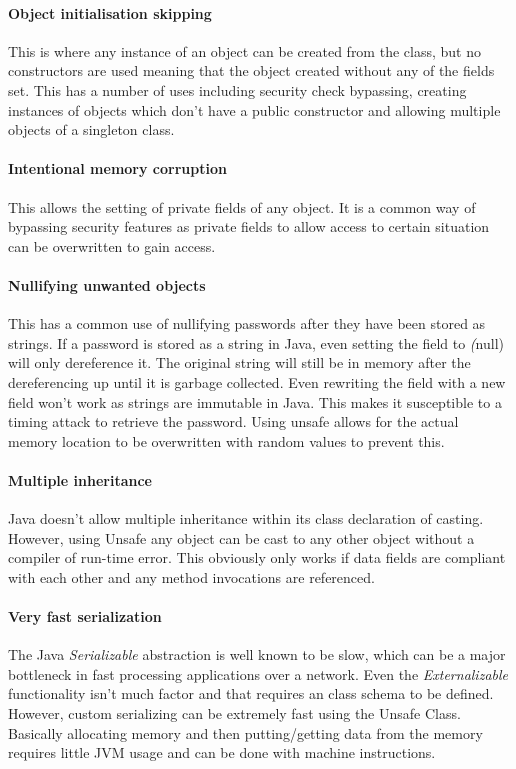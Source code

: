 \documentclass[final_report.tex]{subfiles}
\begin{document}
\paragraph*{Object initialisation skipping}
This is where any instance of an object can be created from the class, but no constructors are used meaning that the object created without any of the fields set. This has a number of uses including security check bypassing, creating instances of objects which don't have a public constructor and allowing multiple objects of a singleton class.

\paragraph*{Intentional memory corruption}
This allows the setting of private fields of any object. It is a common way of bypassing security features as private fields to allow access to certain situation can be overwritten to gain access.

\paragraph*{Nullifying unwanted objects}
This has a common use of nullifying passwords after they have been stored as strings. If a password is stored as a string in Java, even setting the field to \textit(null) will only dereference it. The original string will still be in memory after the dereferencing up until it is garbage collected. Even rewriting the field with a new field won't work as strings are immutable in Java. This makes it susceptible to a timing attack to retrieve the password. Using unsafe allows for the actual memory location to be overwritten with random values to prevent this.

\paragraph*{Multiple inheritance}
Java doesn't allow multiple inheritance within its class declaration of casting. However, using Unsafe any object can be cast to any other object without a compiler of run-time error. This obviously only works if data fields are compliant with each other and any method invocations are referenced. 

\paragraph*{Very fast serialization}
The Java \textit{Serializable} abstraction is well known to be slow, which can be a major bottleneck in fast processing applications over a network. Even the \textit{Externalizable} functionality isn't much factor and that requires an class schema to be defined. However, custom serializing can be extremely fast using the Unsafe Class. Basically allocating memory and then putting/getting data from the memory requires little JVM usage and can be done with machine instructions.
\end{document}
